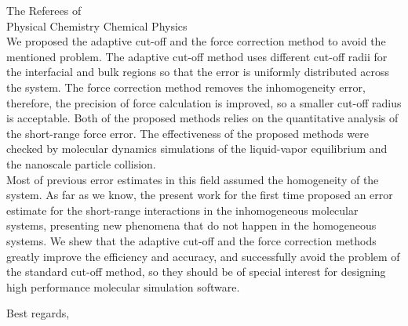 \documentclass{scrlttr2}
\begin{document}
\begin{letter}{
    The Referees of\\
    Physical Chemistry Chemical Physics\\
    \vskip 0cm
  }
We proposed the adaptive cut-off and the force correction method to
avoid the mentioned problem. The adaptive cut-off method uses different
cut-off radii for the interfacial and bulk regions so that the error
is uniformly distributed across the system. The force correction
method removes the inhomogeneity error, therefore, the precision of
force calculation is improved, so a smaller cut-off radius is
acceptable. Both of the proposed methods relies on the quantitative
analysis of the short-range force error.  The effectiveness of
the proposed methods were checked by molecular dynamics simulations of
the liquid-vapor equilibrium and the nanoscale
particle collision.\\

Most of previous error estimates in this field assumed the homogeneity
of the system. As far as we know, the present work for the first time
proposed an error estimate for the short-range interactions in the
inhomogeneous molecular systems, presenting new phenomena that do not
happen in the homogeneous systems.  We shew that the adaptive cut-off
and the force correction methods greatly improve the efficiency and
accuracy, and successfully avoid the problem of the standard cut-off
method, so they should be of special interest for designing high
performance molecular simulation software.
\\

\closing{Best regards,
}













\end{letter}
\end{document}
